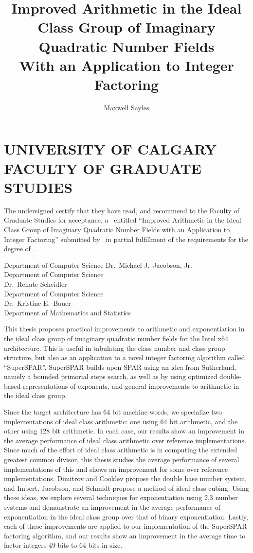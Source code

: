 \documentclass{ucalgthes1}
\title{Improved Arithmetic in the Ideal Class Group of Imaginary Quadratic Number Fields \\ \bigskip With an Application to Integer Factoring}
\author{Maxwell Sayles}
\newcommand{\thesistitle}{Improved Arithmetic in the Ideal Class Group of Imaginary Quadratic Number Fields with an Application to Integer Factoring}
\theoremstyle{definition}
\begin{document}
\makethesistitle
{}     %
\setcounter{page}{1}
\chapter*{UNIVERSITY OF CALGARY \\ FACULTY OF GRADUATE STUDIES}
\thispagestyle{empty}
The undersigned certify that they have read, and recommend
to the Faculty of Graduate Studies for acceptance, a \Thesis\ entitled
``\thesistitle'' submitted by \Author\
in partial fulfillment of the requirements for the degree of
\Degree.\\

%

\begin{signing}{Department of Computer Science}
\signline
Dr.~Michael J.~Jacobson, Jr. \\
Department of Computer Science \\
\signline
Dr.~Renate Scheidler \\
Department of Computer Science \\
\signline
Dr.~Kristine E.~Bauer \\
Department of Mathematics and Statistics \\
\end{signing}

\newpage
{}
{}

This thesis proposes practical improvements to arithmetic and exponentiation in the ideal class group of imaginary quadratic number fields for the Intel x64 architecture.  This is useful in tabulating the class number and class group structure, but also as an application to a novel integer factoring algorithm called ``SuperSPAR''.  SuperSPAR builds upon SPAR using an idea from Sutherland, namely a bounded primorial steps search, as well as by using optimized double-based representations of exponents, and general improvements to arithmetic in the ideal class group.

Since the target architecture has 64 bit machine words, we specialize two implementations of ideal class arithmetic: one using 64 bit arithmetic, and the other using 128 bit arithmetic.  In each case, our results show an improvement in the average performance of ideal class arithmetic over reference implementations.  Since much of the effort of ideal class arithmetic is in computing the extended greatest common divisor, this thesis studies the average performance of several implementations of this and shows an improvement for some over reference implementations.  Dimitrov and Cooklev propose the double base number system, and Imbert, Jacobson, and Schmidt propose a method of ideal class cubing.  Using these ideas, we explore several techniques for exponentiation using 2,3 number systems and demonstrate an improvement in the average performance of exponentiation in the ideal class group over that of binary exponentiation.  Lastly, each of these improvements are applied to our implementation of the SuperSPAR factoring algorithm, and our results show an improvement in the average time to factor integers 49 bits to 64 bits in size.
\end{document}
